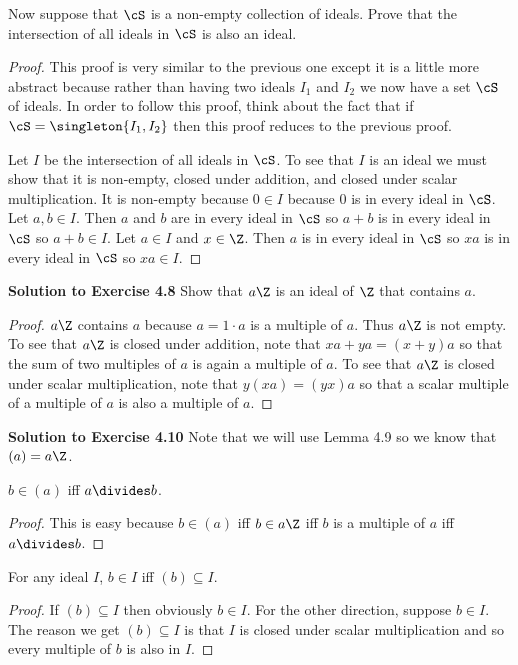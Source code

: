 \documentclass[oneside,12pt]{amsart}
\begin{document}
Now suppose that $\cS$ is a non-empty collection of ideals. Prove that the intersection
of all ideals in $\cS$ is also an ideal.

\begin{proof}
This proof is very similar to the previous one except it is a little more abstract because rather than having two ideals $I_1$ and $I_2$ we now have
a set $\cS$ of ideals. In order to follow this proof, think about the fact that if $\cS = \singleton{I_1, I_2}$ then this proof reduces to the previous proof.

Let $I$ be the intersection of all ideals in $\cS$. To see that $I$ is an ideal we must show that it is non-empty, closed under addition, and closed under scalar multiplication. It is non-empty because $0\in I$ because 0 is in every ideal in $\cS$. Let $a, b \in I$. Then $a$ and $b$ are in every ideal in $\cS$ so $a+b$ is in every ideal in $\cS$ so $a+b\in I$. Let $a\in I$ and $x\in\Z$. Then $a$ is in every ideal in $\cS$ so $xa$ is in every ideal in $\cS$ so $xa\in I$.
\end{proof}

\bigskip

\textbf{Solution to Exercise 4.8} Show that $a\Z$ is an ideal of $\Z$ that contains $a$.
\begin{proof}
$a\Z$ contains $a$ because $a=1\cdot a$ is a multiple of $a$. Thus $a\Z$ is not empty. To see that $a\Z$ is closed under addition, note that
$xa + ya = (x+y)a$ so that the sum of two multiples of $a$ is again a multiple of $a$. To see that $a\Z$ is closed under scalar multiplication,
note that $y(xa) = (yx)a$ so that a scalar multiple of a multiple of $a$ is also a multiple of $a$.
\end{proof}

\bigskip

\textbf{Solution to Exercise 4.10}  Note that we will use Lemma 4.9 so we know that $(a) = a\Z$.

$b\in (a)$ iff $a\divides b$.
\begin{proof}
This is easy because $b\in (a)$ iff $b\in a\Z$ iff $b$ is a multiple of $a$ iff $a\divides b$.
\end{proof}

For any ideal $I$, $b\in I$ iff $(b)\subseteq I$.
\begin{proof}
If $(b)\subseteq I$ then obviously $b\in I$. For the other direction, suppose $b\in I$. The reason we get $(b)\subseteq I$ is that $I$ is closed under scalar multiplication and so every multiple of $b$ is also in $I$.
\end{proof}
\end{document}
